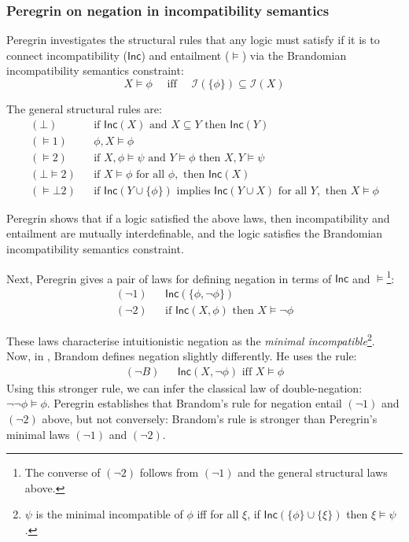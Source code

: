 \subsubsection{Peregrin on negation in incompatibility semantics}\label{peregrin}

Peregrin \cite{peregrin} investigates the  structural
rules that any logic must satisfy if it is to connect incompatibility
($\mathsf{Inc}$) and entailment ($\models$) via the Brandomian
incompatibility semantics constraint:
\[
X \models \phi \quad\text{ iff }\quad \mathcal{I}(\{\phi\}) \subseteq \mathcal{I}(X)
\]

\NI The general structural rules are:
\begin{eqnarray*}
  (\bot) & & \text{if } \mathsf{Inc}(X) \text{ and } X \subseteq Y \text{ then } \mathsf{Inc}(Y) \\
  (\models 1) & & \phi, X \models \phi \\
  (\models 2) & & \text{if }X, \phi \models \psi \text{ and } Y \models \phi \text{ then } X, Y \models \psi \\
  (\bot \models 2) & & \text{if } X \models \phi \text{ for all } \phi, \text{ then } \mathsf{Inc}(X) \\
  (\models \bot 2) & & \text{if } \mathsf{Inc}(Y \cup \{\phi\}) \text{ implies } \mathsf{Inc}(Y \cup X) \text{ for all } Y, \text{ then } X \models \phi
\end{eqnarray*}

\NI Peregrin shows that if a logic satisfied the above laws, then
incompatibility and entailment are mutually interdefinable, and the
logic satisfies the Brandomian incompatibility semantics constraint.

Next, Peregrin gives a pair of laws for defining negation in terms
of $\mathsf{Inc}$ and $\models$\footnote{The converse of $(\neg 2)$
  follows from $(\neg 1)$ and the general structural laws above.}:
\begin{eqnarray*}
  (\neg 1) & & \mathsf{Inc}(\{\phi, \neg \phi\}) \\
  (\neg 2) & & \text{if } \mathsf{Inc}(X, \phi) \text{ then } X \models \neg \phi
\end{eqnarray*}

\NI These laws characterise intuitionistic negation as the
\emph{minimal incompatible}\footnote{$\psi$ is the minimal
  incompatible of $\phi$ iff for all $\xi$, if $\mathsf{Inc}(\{\phi\}
  \cup \{\xi\})$ then $\xi \models \psi$.}.  
  Now, in \cite{brandom},
Brandom defines negation slightly differently. He uses the rule:
\begin{eqnarray*}
  (\neg B) & &\mathsf{Inc}(X, \neg \phi) \text{ iff } X \models \phi
\end{eqnarray*}
Using this stronger rule, we can infer the classical law of
double-negation: $\neg \neg \phi \models \phi$.  Peregrin establishes
that Brandom's rule for negation entail $(\neg 1)$ and $(\neg 2)$
above, but not conversely: Brandom's rule is stronger than Peregrin's
minimal laws $(\neg 1)$ and $(\neg 2)$.

